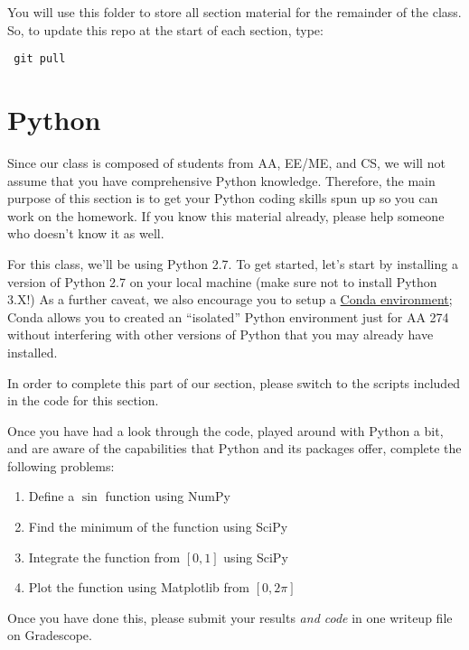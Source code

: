 \documentclass{article}
\begin{document}
You will use this folder to store all section material for the remainder of the class. So, to update this repo at the start of each section, type: 

 \begin{lstlisting}
 git pull
\end{lstlisting}


\section{Python}
Since our class is composed of students from AA, EE/ME, and CS, we will not assume that you have comprehensive Python knowledge. Therefore, the main purpose of this section is to get your Python coding skills spun up so you can work on the homework. If you know this material already, please help someone who doesn't know it as well.

For this class, we'll be using Python 2.7. To get started, let's start by installing a version of Python 2.7 on your local machine (make sure not to install Python 3.X!) As a further caveat, we also encourage you to setup a \href{https://docs.conda.io/projects/conda/en/latest/user-guide/tasks/manage-environments.html}{Conda environment}; Conda allows you to created an ``isolated'' Python environment just for AA 274 without interfering with other versions of Python that you may already have installed.

In order to complete this part of our section, please switch to the scripts included in the code for this section.


Once you have had a look through the code, played around with Python a bit, and are aware of the capabilities that Python and its packages offer, complete the following problems:
{\bf
\begin{enumerate}
\item Define a $\sin$ function using NumPy
\item Find the minimum of the function using SciPy
\item Integrate the function from $[0, 1]$ using SciPy
\item Plot the function using Matplotlib from $[0, 2\pi]$
\end{enumerate}
}
Once you have done this, please submit your results \textit{and code} in one writeup file on Gradescope.
\end{document}
